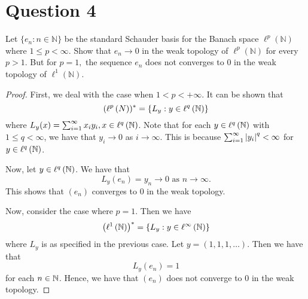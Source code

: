 \section{Question 4}
\horz
Let $\{ e_n:n\in\mathbb N\}$ be the standard Schauder basis for the Banach space $\ell^p(\mathbb N)$ where $1 \leqslant p < \infty.$  Show that $e_n \to 0$ in the weak topology of $\ell^p(\mathbb N)$ for every $p >1.$ But for $p=1,$ the sequence $e_n$ does not converges to $0$ in the weak topology of $\ell^1(\mathbb N).$
\horz
\begin{proof}
    First, we deal with the case when $1<p < +\infty$. It can be shown that
    \begin{equation*}
	(\ell ^{p} \left( N \right))^{*} = \left\{ L_{y} : y \in \ell ^{q} \left( \mathbb N \right) \right\}
    \end{equation*}
    where $L_{y}(x)=\sum_{i=1}^{\infty} x_{i}y_{i}, x\in \ell ^{q} \left( \mathbb N \right)$. Note that for each $y\in \ell ^{q} \left( \mathbb N \right)$ with $1 \le q < \infty$, we have that $y_{i} \to 0$ as $i \to \infty$. This is because $\sum_{i=1}^{\infty} \left\lvert y_{i} \right\rvert^{q} < \infty$ for $y \in\ell^{q} \left( \mathbb N \right)$. 

    Now, let $y\in \ell ^{q} \left( \mathbb N \right)$. We have that 
    \begin{equation*}
	L_{y} \left( e_{n} \right) = y_{n} \to 0 \text{ as } n \to \infty.
    \end{equation*}
    This shows that $\left( e_{n} \right) $ converges to $0$ in the weak topology.

    Now, consider the case where $p=1$. Then we have
    \begin{equation*}
	\left( \ell ^{1} \left( \mathbb N \right) \right)^{*} = \left\{ L_{y} : y \in \ell ^{\infty} \left( \mathbb N \right) \right\}
    \end{equation*}
    where $L_{y}$ is as specified in the previous case. Let $y=\left( 1,1,1,\ldots \right)$. Then we have that
    \begin{equation*}
	L_{y} \left( e_{n} \right) = 1
    \end{equation*}
    for each $n \in \mathbb N$. Hence, we have that $(e_{n})$ does not converge to $0$ in the weak topology.
\end{proof}
